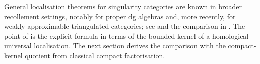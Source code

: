 \begin{remark}\label{rem:prior-localization}
General localisation theorems for singularity categories are known in broader recollement settings, notably for proper dg algebras and, more recently, for weakly approximable triangulated categories; see \cite{JinYangZhou,SunZhangZhang} and the comparison in .  The point of  is the explicit formula in terms of the bounded kernel of a homological universal localisation.  The next section derives the comparison with the compact-kernel quotient from classical compact factorisation.
\end{remark}

